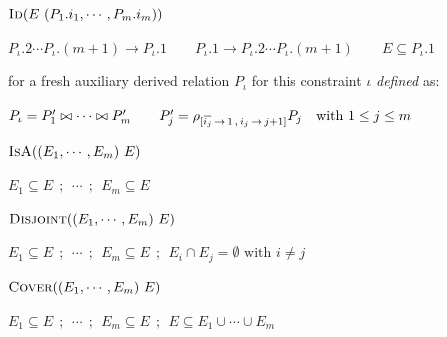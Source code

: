 \documentclass[10pt]{article}
\newcommand{\ols}[1]{\mskip.5\thinmuskip\overline{\mskip-.5\thinmuskip {#1} \mskip-.5\thinmuskip}\mskip.5\thinmuskip} %
\begin{document}

\vspace{.5ex}\noindent
$\textsc{Id}(E\ (P_1.i_1, \cdots , P_m.i_m))$

$
P_\iota.2 \cdots P_\iota.(m\!+\!1)\rightarrow P_\iota.1
\qquad
P_\iota.1\rightarrow P_\iota.2\cdots P_\iota.(m\!+\!1)
\qquad
E\subseteq P_\iota.1 
$

for a fresh auxiliary derived relation \(P_\iota\) for this constraint \(\iota\)
\textit{defined} as:

\qquad$
P_\iota=P_1'\bowtie\cdots\bowtie P'_m 
\qquad
P'_j=\rho_{[\ols{i_j}\,\rightarrow\, 1\,,\,{i_j}\,\rightarrow\, j+1]}P_j
\quad\text{with }1\leq j\leq m
$

\noindent
$\textsc{IsA}((E_1,\cdots,E_m)\ E)$

$E_1\subseteq E ~~;~~\cdots ~~;~~E_m\subseteq E$

\noindent
$\textsc{Disjoint}((E_1,\cdots,E_m)\ E)$ 
 
$E_1\subseteq E ~~;~~\cdots ~~;~~E_m\subseteq E ~~;~~
E_i\cap E_j=\emptyset \text{ with } i\neq j$

\noindent
$\textsc{Cover}((E_1,\cdots,E_m)\ E)$

$E_1\subseteq E ~~;~~\cdots ~~;~~E_m\subseteq E ~~;~~
E\subseteq E_1 \cup\cdots\cup E_m$
\end{document}
